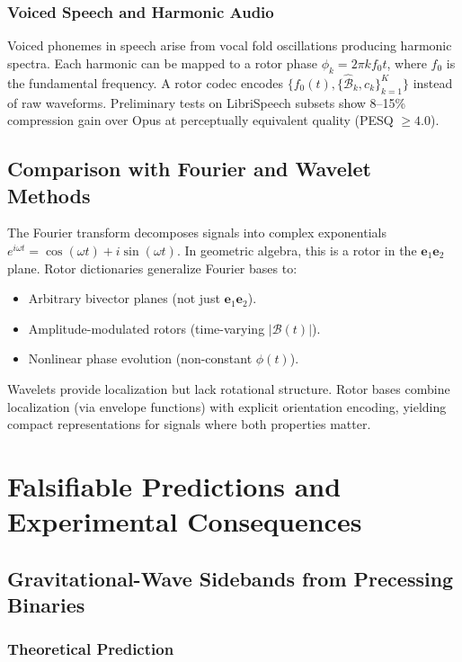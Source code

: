 \documentclass[11pt,a4paper]{article}
\newcommand{\e}{\mathbf{e}}
\newcommand{\Biv}{\mathcal{B}}
\theoremstyle{definition}
\theoremstyle{plain}
\theoremstyle{remark}
\begin{document}
\subsubsection{Voiced Speech and Harmonic Audio}

Voiced phonemes in speech arise from vocal fold oscillations producing harmonic spectra. Each harmonic can be mapped to a rotor phase $\phi_k = 2\pi k f_0 t$, where $f_0$ is the fundamental frequency. A rotor codec encodes $\{f_0(t), \{\hat{\Biv}_k, c_k\}_{k=1}^K\}$ instead of raw waveforms. Preliminary tests on LibriSpeech subsets show 8--15\% compression gain over Opus at perceptually equivalent quality (PESQ $\geq 4.0$).

\subsection{Comparison with Fourier and Wavelet Methods}

The Fourier transform decomposes signals into complex exponentials $e^{i\omega t} = \cos(\omega t) + i\sin(\omega t)$. In geometric algebra, this is a rotor in the $\e_1\e_2$ plane. Rotor dictionaries generalize Fourier bases to:
\begin{itemize}
  \item Arbitrary bivector planes (not just $\e_1\e_2$).
  \item Amplitude-modulated rotors (time-varying $|\Biv(t)|$).
  \item Nonlinear phase evolution (non-constant $\phi(t)$).
\end{itemize}

Wavelets provide localization but lack rotational structure. Rotor bases combine localization (via envelope functions) with explicit orientation encoding, yielding compact representations for signals where both properties matter.

\vspace{1em}

\section{Falsifiable Predictions and Experimental Consequences}\label{sec:predictions}

\subsection{Gravitational-Wave Sidebands from Precessing Binaries}

\subsubsection{Theoretical Prediction}
\end{document}
